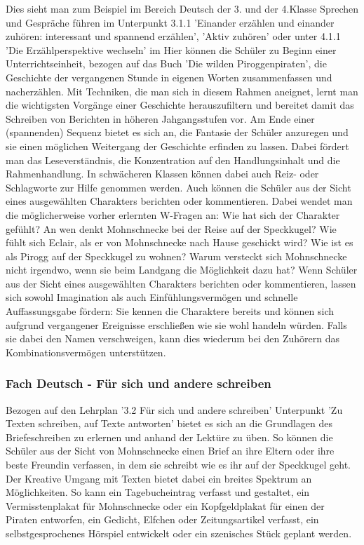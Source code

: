 Dies sieht man zum Beispiel im Bereich Deutsch der 3. und der 4.Klasse Sprechen und Gespräche führen im Unterpunkt 3.1.1 'Einander erzählen und einander zuhören: interessant und spannend erzählen',\cite[S.172]{LP GS 2000}  'Aktiv zuhören'\cite[S.172]{LP GS 2000}  oder unter 4.1.1 'Die Erzählperspektive wechseln' \cite[S.246]{LP GS 2000}  im
Hier können die Schüler zu Beginn einer Unterrichtseinheit, bezogen auf das Buch 'Die wilden Piroggenpiraten',\cite{pir} die Geschichte der vergangenen Stunde in eigenen Worten zusammenfassen und nacherzählen. Mit Techniken, die man sich in diesem Rahmen aneignet, lernt man die wichtigsten Vorgänge einer Geschichte herauszufiltern und  bereitet damit das Schreiben von Berichten in höheren Jahgangsstufen vor. 
Am Ende einer (spannenden) Sequenz bietet es sich an, die Fantasie der Schüler anzuregen und sie einen möglichen Weitergang der Geschichte erfinden zu lassen. Dabei fördert man das Leseverständnis, die Konzentration auf den Handlungsinhalt und die Rahmenhandlung. In schwächeren Klassen können dabei auch Reiz- oder Schlagworte zur Hilfe genommen werden. 
Auch können die Schüler aus der Sicht eines ausgewählten Charakters berichten oder kommentieren. Dabei wendet man die möglicherweise vorher erlernten W-Fragen an: Wie hat sich der Charakter gefühlt? An wen denkt Mohnschnecke bei der Reise auf der Speckkugel? Wie fühlt sich Eclair, als er von Mohnschnecke nach Hause geschickt wird? Wie ist es als Pirogg auf der Speckkugel zu wohnen? Warum versteckt sich Mohnschnecke nicht irgendwo, wenn sie beim Landgang die Möglichkeit dazu hat?
Wenn Schüler aus der Sicht eines ausgewählten Charakters berichten oder kommentieren, lassen sich sowohl Imagination als auch Einfühlungsvermögen und schnelle Auffassungsgabe fördern: Sie kennen die Charaktere bereits und können sich aufgrund vergangener Ereignisse erschließen wie sie wohl handeln würden. Falls sie dabei den Namen verschweigen, kann dies wiederum bei den Zuhörern das Kombinationsvermögen unterstützen.

\subsubsection{Fach Deutsch - Für sich und andere schreiben}

Bezogen auf den Lehrplan '3.2 Für sich und andere schreiben' Unterpunkt 'Zu Texten schreiben, auf Texte antworten' \cite[S.174]{LP GS 2000}  bietet es sich an die Grundlagen des Briefeschreiben zu erlernen und anhand der Lektüre zu üben. So können die Schüler aus der Sicht von Mohnschnecke einen Brief an ihre Eltern oder ihre beste Freundin verfassen, in dem sie schreibt wie es ihr auf der Speckkugel geht. Der Kreative Umgang mit Texten bietet dabei ein breites Spektrum an Möglichkeiten. So kann ein Tagebucheintrag verfasst und gestaltet, ein Vermisstenplakat für Mohnschnecke oder ein Kopfgeldplakat für einen der Piraten entworfen, ein Gedicht, Elfchen oder Zeitungsartikel verfasst, ein selbstgesprochenes Hörspiel entwickelt oder ein szenisches Stück geplant werden.

